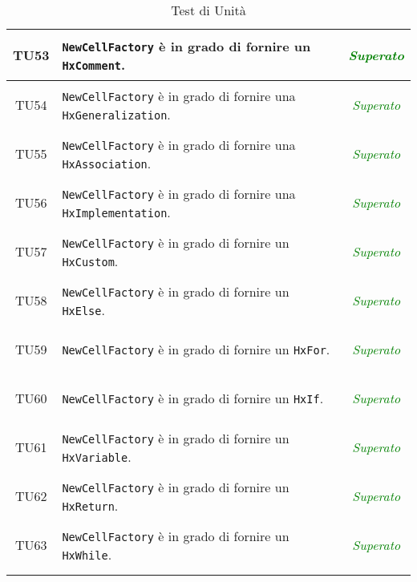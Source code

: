 \begin{longtable}{|c|>{}m{8cm}|c|}
\hypertarget{TU53}{TU53} & \texttt{NewCellFactory} è in grado di fornire un \texttt{HxComment}. & \textcolor{Green}{\textit{Superato}}\\ \hline
\hypertarget{TU54}{TU54} & \texttt{NewCellFactory} è in grado di fornire una \texttt{HxGeneralization}. & \textcolor{Green}{\textit{Superato}}\\ \hline
\hypertarget{TU55}{TU55} & \texttt{NewCellFactory} è in grado di fornire una \texttt{HxAssociation}. & \textcolor{Green}{\textit{Superato}}\\ \hline
\hypertarget{TU56}{TU56} & \texttt{NewCellFactory} è in grado di fornire una \texttt{HxImplementation}. & \textcolor{Green}{\textit{Superato}}\\ \hline
\hypertarget{TU57}{TU57} & \texttt{NewCellFactory} è in grado di fornire un \texttt{HxCustom}. & \textcolor{Green}{\textit{Superato}}\\ \hline
\hypertarget{TU58}{TU58} & \texttt{NewCellFactory} è in grado di fornire un \texttt{HxElse}. & \textcolor{Green}{\textit{Superato}}\\ \hline
\hypertarget{TU59}{TU59} & \texttt{NewCellFactory} è in grado di fornire un \texttt{HxFor}. & \textcolor{Green}{\textit{Superato}}\\ \hline
\hypertarget{TU60}{TU60} & \texttt{NewCellFactory} è in grado di fornire un \texttt{HxIf}. & \textcolor{Green}{\textit{Superato}}\\ \hline
\hypertarget{TU61}{TU61} & \texttt{NewCellFactory} è in grado di fornire un \texttt{HxVariable}. & \textcolor{Green}{\textit{Superato}}\\ \hline
\hypertarget{TU62}{TU62} & \texttt{NewCellFactory} è in grado di fornire un \texttt{HxReturn}. & \textcolor{Green}{\textit{Superato}}\\ \hline
\hypertarget{TU63}{TU63} & \texttt{NewCellFactory} è in grado di fornire un \texttt{HxWhile}. & \textcolor{Green}{\textit{Superato}}\\ \hline
\caption[Test di Unità]{Test di Unità}
\label{tabella:test3}
\end{longtable}
\clearpage

